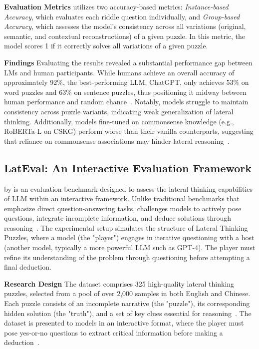 \textbf{Evaluation Metrics}
\citeauthor{jiangBRAINTEASERLateralThinking2023} utilizes two accuracy-based metrics:
\textit{Instance-based Accuracy}, which evaluates each riddle question individually, and \textit{Group-based Accuracy}, which assesses the model's consistency across all variations (original, semantic, and contextual reconstructions) of a given puzzle. In this metric, the model scores 1 if it correctly solves all variations of a given puzzle.

\textbf{Findings}
Evaluating the results revealed a substantial performance gap between \acp{LM} and human participants. While humans achieve an overall accuracy of approximately 92\%, the best-performing \ac{LLM}, ChatGPT, only achieves 53\% on word puzzles and 63\% on sentence puzzles, thus positioning it midway between human performance and random chance~\cite{jiangBRAINTEASERLateralThinking2023}. Notably, models struggle to maintain consistency across puzzle variants, indicating weak generalization of lateral thinking. Additionally, models fine-tuned on commonsense knowledge (e.g., RoBERTa-L on CSKG) perform worse than their vanilla counterparts, suggesting that reliance on commonsense associations may hinder lateral reasoning~\cite{jiangBRAINTEASERLateralThinking2023}.

\subsection{LatEval: An Interactive Evaluation Framework}

 by \textcite{huangLatEvalInteractiveLLMs2024} is an evaluation benchmark designed to assess the lateral thinking capabilities of \ac{LLM} within an interactive framework. Unlike traditional benchmarks that emphasize direct question-answering tasks,  challenges models to actively pose questions, integrate incomplete information, and deduce solutions through reasoning~\cite{huangLatEvalInteractiveLLMs2024}. The experimental setup simulates the structure of Lateral Thinking Puzzles, where a model (the "player") engages in iterative questioning with a host (another model, typically a more powerful \ac{LLM} such as GPT-4). The player must refine its understanding of the problem through questioning before attempting a final deduction.

\textbf{Research Design}
The dataset comprises 325 high-quality lateral thinking puzzles, selected from a pool of over 2,000 samples in both English and Chinese. Each puzzle consists of an incomplete narrative (the "puzzle"), its corresponding hidden solution (the "truth"), and a set of key clues essential for reasoning~\cite{huangLatEvalInteractiveLLMs2024}. The dataset is presented to models in an interactive format, where the player must pose yes-or-no questions to extract critical information before making a deduction~\cite{huangLatEvalInteractiveLLMs2024}.

